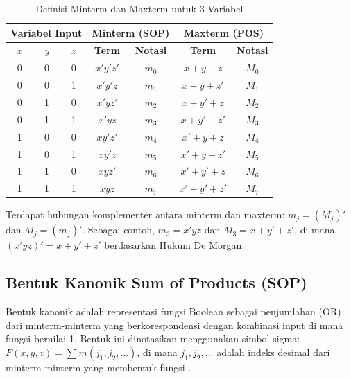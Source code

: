 \begin{table}[htbp]
\centering
\small
\renewcommand{\arraystretch}{1.2}
\begin{tabular}{|c|c|c||c|c||c|c|}
\hline
\multicolumn{3}{|c||}{\textbf{Variabel Input}} & \multicolumn{2}{c||}{\textbf{Minterm (SOP)}} & \multicolumn{2}{c|}{\textbf{Maxterm (POS)}} \\ \hline
$x$ & $y$ & $z$ & \textbf{Term} & \textbf{Notasi} & \textbf{Term} & \textbf{Notasi} \\ \hline
0 & 0 & 0 & $x'y'z'$ & $m_0$ & $x+y+z$ & $M_0$ \\ \hline
0 & 0 & 1 & $x'y'z$ & $m_1$ & $x+y+z'$ & $M_1$ \\ \hline
0 & 1 & 0 & $x'yz'$ & $m_2$ & $x+y'+z$ & $M_2$ \\ \hline
0 & 1 & 1 & $x'yz$ & $m_3$ & $x+y'+z'$ & $M_3$ \\ \hline
1 & 0 & 0 & $xy'z'$ & $m_4$ & $x'+y+z$ & $M_4$ \\ \hline
1 & 0 & 1 & $xy'z$ & $m_5$ & $x'+y+z'$ & $M_5$ \\ \hline
1 & 1 & 0 & $xyz'$ & $m_6$ & $x'+y'+z$ & $M_6$ \\ \hline
1 & 1 & 1 & $xyz$ & $m_7$ & $x'+y'+z'$ & $M_7$ \\ \hline
\end{tabular}
\caption{Definisi Minterm dan Maxterm untuk 3 Variabel}
\label{tab:minterm-maxterm-lengkap}
\end{table}

\begin{catatan}
Terdapat hubungan komplementer antara minterm dan maxterm: $m_j = (M_j)'$ dan $M_j = (m_j)'$. Sebagai contoh, $m_3 = x'yz$ dan $M_3 = x + y' + z'$, di mana $(x'yz)' = x + y' + z'$ berdasarkan Hukum De Morgan.
\end{catatan}

\subsection{Bentuk Kanonik Sum of Products (SOP)}

\begin{definisi}
Bentuk kanonik  adalah representasi fungsi Boolean sebagai penjumlahan (OR) dari minterm-minterm yang berkorespondensi dengan kombinasi input di mana fungsi bernilai 1. Bentuk ini dinotasikan menggunakan simbol sigma: $F(x, y, z) = \sum m(j_1, j_2, \ldots)$, di mana $j_1, j_2, \ldots$ adalah indeks desimal dari minterm-minterm yang membentuk fungsi \cite{geeksforgeeks_sop_pos}.
\end{definisi}

